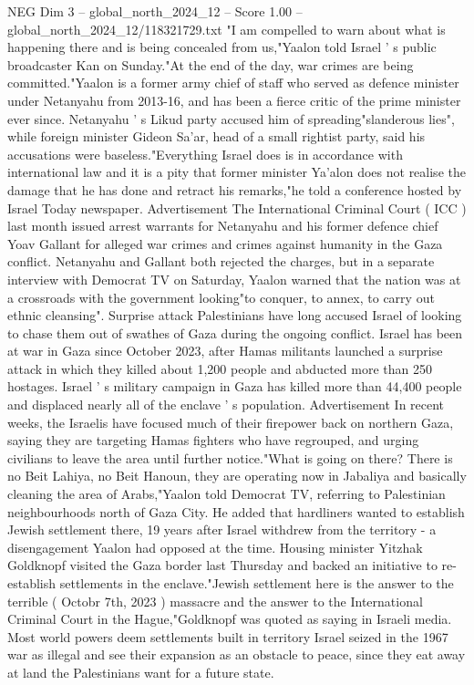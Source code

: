 \begin{textsample}{NEG Dim 3 – global\_north\_2024\_12 – Score 1.00 – global\_north\_2024\_12/118321729.txt}  \label{ex:f3_neg_245}
"I am compelled to warn about what is happening there and is being concealed from us,"Yaalon told Israel ' s public broadcaster Kan on Sunday."At the end of the day, war crimes are being committed."Yaalon is a former army chief of staff who served as defence minister under Netanyahu from 2013-16, and has been a fierce critic of the prime minister ever since.
Netanyahu ' s Likud party accused him of spreading"slanderous lies", while foreign minister Gideon Sa'ar, head of a small rightist party, said his accusations were baseless."Everything Israel does is in accordance with international law and it is a pity that former minister Ya'alon does not realise the damage that he has done and retract his remarks,"he told a conference hosted by Israel Today newspaper.
Advertisement The International Criminal Court ( ICC ) last month issued arrest warrants for Netanyahu and his former defence chief Yoav Gallant for alleged war crimes and crimes against humanity in the Gaza conflict.
Netanyahu and Gallant both rejected the charges, but in a separate interview with Democrat TV on Saturday, Yaalon warned that the nation was at a crossroads with the government looking"to conquer, to annex, to carry out ethnic cleansing".
Surprise attack Palestinians have long accused Israel of looking to chase them out of swathes of Gaza during the ongoing conflict.
Israel has been at war in Gaza since October 2023, after Hamas militants launched a surprise attack in which they killed about 1,200 people and abducted more than 250 hostages.
Israel ' s military campaign in Gaza has killed more than 44,400 people and displaced nearly all of the enclave ' s population.
Advertisement In recent weeks, the Israelis have focused much of their firepower back on northern Gaza, saying they are targeting Hamas fighters who have regrouped, and urging civilians to leave the area until further notice."What is going on there?
There is no Beit Lahiya, no Beit Hanoun, they are operating now in Jabaliya and basically cleaning the area of Arabs,"Yaalon told Democrat TV, referring to Palestinian neighbourhoods north of Gaza City.
He added that hardliners wanted to establish Jewish settlement there, 19 years after Israel withdrew from the territory - a disengagement Yaalon had opposed at the time.
Housing minister Yitzhak Goldknopf visited the Gaza border last Thursday and backed an initiative to re-establish settlements in the enclave."Jewish settlement here is the answer to the terrible ( Octobr 7th, 2023 ) massacre and the answer to the International Criminal Court in the Hague,"Goldknopf was quoted as saying in Israeli media.
Most world powers deem settlements built in territory Israel seized in the 1967 war as illegal and see their expansion as an obstacle to peace, since they eat away at land the Palestinians want for a future state.

\end{textsample}
